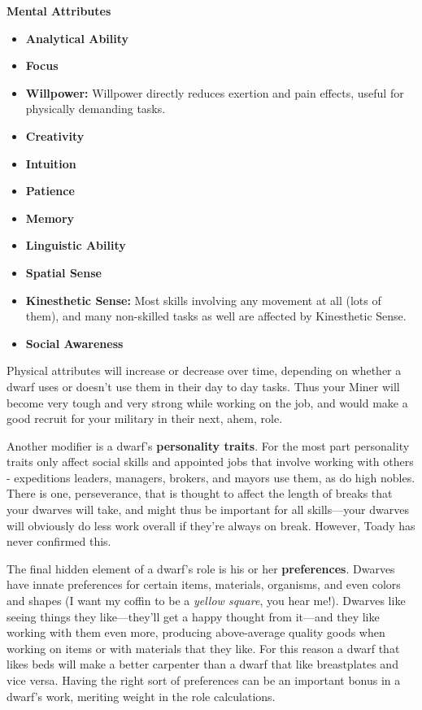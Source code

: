 \documentclass[]{article}
\begin{document}
\textbf{Mental Attributes}
\begin{itemize}[itemsep=1mm] \item \textbf{Analytical Ability} \item \textbf{Focus} \item
\textbf{Willpower:} Willpower directly reduces exertion and pain effects, useful for physically demanding
tasks.
\item \textbf{Creativity} \item \textbf{Intuition} \item \textbf{Patience} \item \textbf{Memory} \item
\textbf{Linguistic Ability} \item \textbf{Spatial Sense} \item \textbf{Kinesthetic Sense:} Most skills
involving any movement at all (lots of them), and many non-skilled tasks as well are affected by
Kinesthetic Sense.
\item \textbf{Social Awareness}
\end{itemize}

Physical attributes will increase or decrease over time, depending on whether a dwarf uses
or doesn't use them in their day to day tasks. Thus your Miner will become very tough and very strong
while working on the job, and would make a good recruit for your military in their
next, ahem, role.

Another modifier is a dwarf's \textbf{personality traits}. For the most part
personality traits only affect social skills and appointed jobs that involve working with others -
expeditions leaders, managers, brokers, and mayors use them, as do high nobles. There is one,
perseverance, that is thought to affect the length of breaks that your dwarves will take, and might thus
be important for all skills---your dwarves will obviously do less work overall if they're
always on break. However, Toady has never confirmed this.

The final hidden element of a dwarf's role is his or her \textbf{preferences}. Dwarves
have innate preferences for certain items, materials, organisms, and even colors and shapes (I want my
coffin to be a \emph{yellow square}, you hear me!). Dwarves like seeing things they like---they'll get a
happy thought from it---and they like working with them even more, producing above-average quality goods
when working on items or with materials that they like. For this reason a dwarf that likes beds will
make a better carpenter than a dwarf that like breastplates and vice versa. Having the right sort of
preferences can be an important bonus in a dwarf's work, meriting weight in the role calculations.
\end{document}
